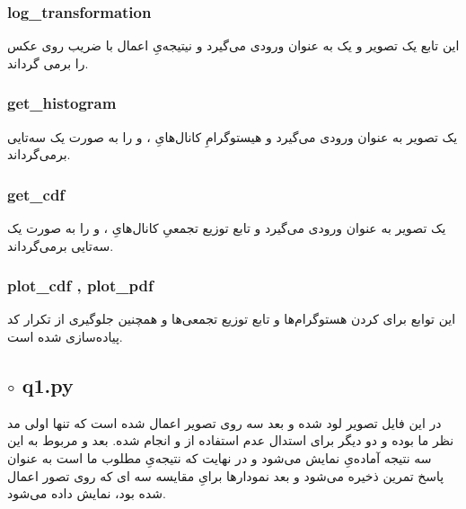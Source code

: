 \documentclass[a4paper,12pt]{article}
\begin{document}
\subsubsection*{log\_transformation}
این تابع یک تصویر و یک 
به عنوان ورودی می‌گیرد و نیتیجه‌یِ اعمال 
با ضریب
 روی عکس را برمی گرداند.
 \subsubsection*{get\_histogram}
 یک تصویر به عنوان ورودی می‌گیرد و هیستوگرامِ کانال‌هایِ 
 ،
و
را به صورت یک سه‌تایی برمی‌گرداند.
\subsubsection*{get\_cdf}
یک تصویر به عنوان ورودی می‌گیرد و تابع توزیع تجمعیِ کانال‌هایِ 
،
و
را به صورت یک سه‌تایی برمی‌گرداند.
\subsubsection*{plot\_cdf , plot\_pdf}
این توابع برای 
کردن هستوگرام‌ها و تابع توزیع تجمعی‌ها و همچنین جلوگیری از تکرار کد پیاده‌سازی شده است.
\subsection*{$\circ$ q1.py}
در این فایل تصویر لود شده و بعد سه 
روی تصویر اعمال شده است که تنها اولی مد نظر ما بوده و دو
  دیگر برای استدال عدم استفاده از 
و 
انجام شده. بعد 
و 
مربوط به این سه نتیجه آماده‌یِ نمایش می‌شود و در نهایت 
که نتیجه‌یِ مطلوب ما است به عنوان پاسخ تمرین ذخیره می‌شود و بعد نمودار‌ها برایِ مقایسه سه 
ای که روی تصور اعمال شده بود، نمایش داده می‌شود.
\end{document}
